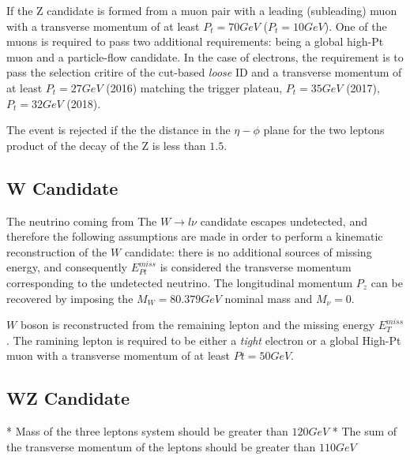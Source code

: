 If the Z candidate is formed from a muon pair with a leading (subleading) muon with
a transverse momentum of at least $P_t=70 GeV$ ($P_t=10GeV$). One of the
muons is required to pass two additional requirements: being a global high-Pt muon and a
particle-flow candidate. In the case of electrons, the requirement is to pass the
selection critire of the cut-based \emph{loose} ID and a transverse momentum of
at least $P_t=27GeV$ (2016) matching the trigger plateau, $P_t=35GeV$ (2017),
$P_t=32GeV$ (2018).

The event is rejected if the the distance in the $\eta-\phi$ plane for the two
leptons product of the decay of the Z is less than $1.5$.

\subsection{W Candidate}

The neutrino coming from The $W \rightarrow l\nu$ candidate escapes undetected,
and therefore the following assumptions are made in order to perform a kinematic
reconstruction of the $W$ candidate: there is no additional sources of missing
energy, and consequently $E_{Pt}^{miss}$ is considered the transverse momentum
corresponding to the undetected neutrino. The longitudinal momentum $P_z$ can be
recovered by imposing the $M_W = 80.379 GeV $ nominal mass and $M_\nu = 0.$

$W$ boson is reconstructed from the remaining lepton and the missing energy
$E_T^{miss}$. The ramining lepton is required to be either
a \emph{tight} electron or a global High-Pt muon with a transverse momentum
of at least $Pt=50GeV$.



\subsection{WZ Candidate}

* Mass of the three leptons system should be greater than $120GeV$
* The sum of the transverse momentum of the leptons should be greater than $110GeV$









